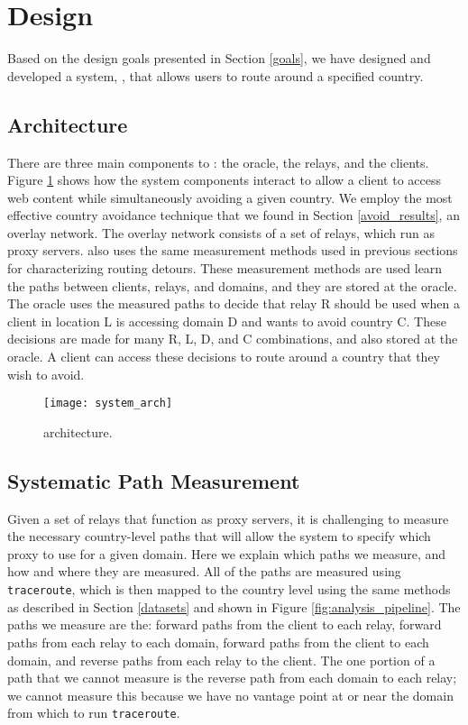 \section{Design}
\label{system_design}
Based on the design goals presented in Section \ref{goals}, we have designed 
and developed a system, \system{}, that allows users to route around a specified 
country.

\subsection{Architecture}

There are three main components to \system{}: the oracle, the relays, and the 
clients.  Figure \ref{fig:arch} shows how the system components
interact to allow a client to access web content while simultaneously avoiding 
a given country.  We employ the most effective country avoidance technique that 
we found in Section \ref{avoid_results}, an overlay network.  The overlay network 
consists of a set of relays, which run as proxy servers.  \system{} also uses 
the same measurement methods used in previous sections for characterizing routing 
detours.  These measurement methods are used learn the paths between clients, 
relays, and domains, and they are stored at the oracle.  The oracle uses the 
measured paths to decide that relay R should be used when a client in location L 
is accessing domain D and wants to avoid country C.  These decisions are made 
for many R, L, D, and C combinations, and also stored at the oracle.  A 
client can access these decisions to route around a country that they wish 
to avoid.

\begin{figure}[t]
\centering
\texttt{[image: system\_arch]}
\caption{\system{} architecture.}
\label{fig:arch}
\end{figure}

\subsection{Systematic Path Measurement}
Given a set of relays that function as proxy servers, it is challenging to 
measure the necessary country-level paths that will allow the system to specify 
which proxy to use for a given domain.  Here we explain which paths we measure, 
and how and where they are measured.  All of the paths are measured using {\tt 
traceroute}, which is then mapped to the country level using the same methods as 
described in Section \ref{datasets} and shown in Figure 
\ref{fig:analysis_pipeline}.  The paths we measure are the: forward paths from 
the client to each relay, forward paths from each relay to each domain, forward 
paths from the client to each domain, and reverse paths from each relay to the 
client.  The one portion of a path that we cannot measure is the reverse path 
from each domain to each relay; we cannot measure this because we have no 
vantage point at or near the domain from which to run {\tt traceroute}.

